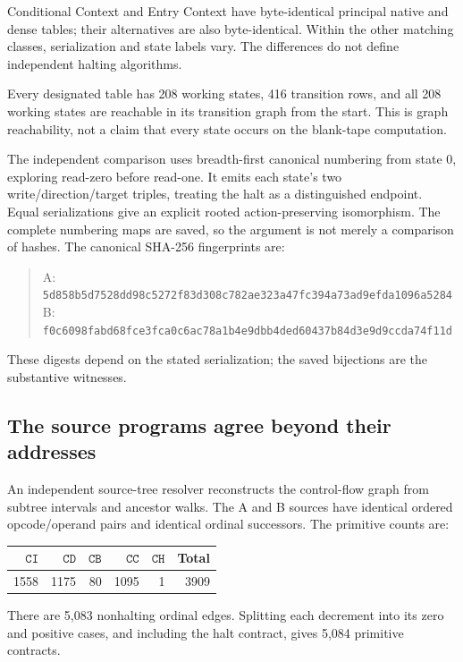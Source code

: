 \documentclass[11pt,a4paper]{article}
\theoremstyle{definition}
\newcommand{\CI}{\mathtt{CI}}
\newcommand{\CD}{\mathtt{CD}}
\newcommand{\CB}{\mathtt{CB}}
\newcommand{\CC}{\mathtt{CC}}
\newcommand{\CH}{\mathtt{CH}}
\begin{document}
Conditional Context and Entry Context have byte-identical principal native and dense tables; their alternatives are also byte-identical. Within the other matching classes, serialization and state labels vary. The differences do not define independent halting algorithms.

Every designated table has 208 working states, 416 transition rows, and all 208 working states are reachable in its transition graph from the start. This is graph reachability, not a claim that every state occurs on the blank-tape computation.

The independent comparison uses breadth-first canonical numbering from state 0, exploring read-zero before read-one. It emits each state's two write/direction/target triples, treating the halt as a distinguished endpoint. Equal serializations give an explicit rooted action-preserving isomorphism. The complete numbering maps are saved, so the argument is not merely a comparison of hashes. The canonical SHA-256 fingerprints are:
\begin{quote}\small\ttfamily
A: \nolinkurl{5d858b5d7528dd98c5272f83d308c782ae323a47fc394a73ad9efda1096a5284}\\
B: \nolinkurl{f0c6098fabd68fce3fca0c6ac78a1b4e9dbb4ded60437b84d3e9d9ccda74f11d}
\end{quote}
These digests depend on the stated serialization; the saved bijections are the substantive witnesses.

\subsection{The source programs agree beyond their addresses}

An independent source-tree resolver reconstructs the control-flow graph from subtree intervals and ancestor walks. The A and B sources have identical ordered opcode/operand pairs and identical ordinal successors. The primitive counts are:
\begin{center}
\begin{tabular}{@{}rrrrrr@{}}
\toprule
$\CI$ & $\CD$ & $\CB$ & $\CC$ & $\CH$ & Total\\
\midrule
1558 & 1175 & 80 & 1095 & 1 & 3909\\
\bottomrule
\end{tabular}
\end{center}
There are 5,083 nonhalting ordinal edges. Splitting each decrement into its zero and positive cases, and including the halt contract, gives 5,084 primitive contracts.
\end{document}
